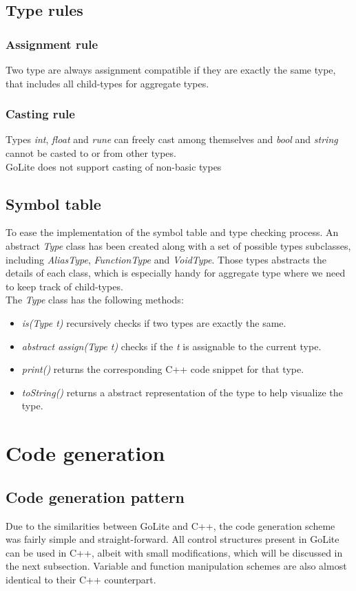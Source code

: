 \documentclass[a4paper]{article}
\begin{document}
\subsection{Type rules}
\subsubsection{Assignment rule}
Two type are always assignment compatible if they are exactly the same type, that includes all child-types for aggregate types.

\subsubsection{Casting rule}
Types \textit{int}, \textit{float} and \textit{rune} can freely cast among themselves and \textit{bool} and \textit{string} cannot be casted to or from other types.\\
GoLite does not support casting of non-basic types

\subsection{Symbol table}
To ease the implementation of the symbol table and type checking process. An abstract \textit{Type} class has been created along with a set of possible types subclasses, including \textit{AliasType}, \textit{FunctionType} and \textit{VoidType}. Those types abstracts the details of each class, which is especially handy for aggregate type where we need to keep track of child-types.\\
The \textit{Type} class has the following methods:
\begin{itemize}
\item \textit{is(Type t)} recursively checks if two types are exactly the same.
\item \textit{abstract assign(Type t)} checks if the \textit{t} is assignable to the current type.
\item \textit{print()} returns the corresponding C++ code snippet for that type.
\item \textit{toString()} returns a abstract representation of the type to help visualize the type.
\end{itemize}

\section{Code generation}

\subsection{Code generation pattern}
Due to the similarities between GoLite and C++, the code generation scheme was fairly simple and straight-forward. All control structures present in GoLite can be used in C++, albeit with small modifications, which will be discussed in the next subsection. Variable and function manipulation schemes are also almost identical to their C++ counterpart.  
\end{document}
